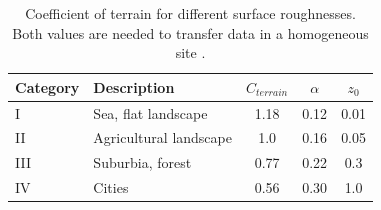 \begin{table}[hbt]
	\small
	\centering
	\captionsetup{format=plain}
	\caption[Coefficient of terrain for different surface roughnesses]{Coefficient of terrain for different surface roughnesses. Both values are needed to transfer data in a homogeneous site \citep{DIN105542005}.}
	\label{tab:boundary_layer_roughness_alpha}
	\begin{tabular}{llSSS}
		\toprule
		Category&  	Description									& {$C_{terrain}$}   & {$\alpha$} 		& {$z_0$} \\
		\midrule
		I 	&	Sea, flat landscape             			& 1.18 				& 0.12     			& 0.01  \\ 
		II 	&	Agricultural landscape         				& 1.0  				& 0.16     			& 0.05  \\ 
		III &	Suburbia, forest              				& 0.77 				& 0.22     			& 0.3   \\ 
		IV 	&	Cities 										& 0.56 				& 0.30    			& 1.0   \\
		\bottomrule
	\end{tabular}
\end{table}

